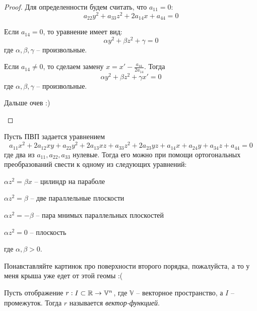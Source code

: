 \begin{proof}
	Для определенности будем считать, что $a_{11} = 0$:
	\[a_{22} y^2 + a_{33} z^2 + 2a_{14} x + a_{44} = 0\]
	\begin{MyItemize}
		\item Если $a_{14} = 0$, то уравнение имеет вид:
		\[\alpha y^2 + \beta z^2 + \gamma = 0\]
		где $\alpha, \beta, \gamma$ -- произвольные.

		\item Если $a_{14} \neq 0$, то сделаем замену $x = x' - \frac{a_{44}}{2a_{14}}$. Тогда 
		\[\alpha y^2 + \beta z^2 + \gamma x' = 0 \]
		где $\alpha, \beta, \gamma$ -- произвольные.

		Дальше очев :)
	\end{MyItemize}
\end{proof}

\begin{Thm}
	Пусть ПВП задается уравнением
	\[a_{11} x^2 + 2a_{12} xy + a_{22} y^2 + 2a_{13} xz + a_{33} z^2 + 2a_{23} yz + a_{14} x + a_{24} y + a_{34} z + a_{44} = 0\]
	где два из $a_{11}, a_{22}, a_{33}$ нулевые. Тогда его можно при помощи ортогональных преобразований свести к одному из следующих уравнений:

	\begin{MyList}
		\item $\alpha z^2 = \beta x$ -- цилиндр на параболе
		\item $\alpha z^2 = \beta$ -- две параллельные плоскости
		\item $\alpha z^2 = -\beta$ -- пара мнимых параллельных плоскостей
		\item $\alpha z^2 = 0$ -- плоскость
	\end{MyList}
	где $\alpha, \beta > 0$.
\end{Thm}

\begin{Rem}
	Понавставляйте картинок про поверхности второго порядка, пожалуйста, а то у меня крыша уже едет от этой геомы :(
\end{Rem}



\begin{Def}
	Пусть отображение $r : I \subset \mathbb{R} \to \mathbb{V}^n$, где $\mathbb{V}$ -- векторное пространство, а $I$ -- промежуток.
	Тогда $r$ называется \textit{вектор-функцией}.  
\end{Def}

